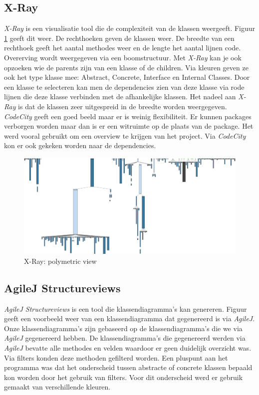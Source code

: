 \documentclass[i1]{oss}
\begin{document}
\subsection{X-Ray} 
\emph{X-Ray} is een visualisatie tool die de complexiteit van de klassen weergeeft. Figuur \ref{fig:X-Ray} geeft dit weer. De rechthoeken geven de klassen weer. De breedte van een rechthoek geeft het aantal methodes weer en de lengte het aantal lijnen code. Overerving wordt weergegeven via een boomstructuur. Met \emph{X-Ray} kan je ook opzoeken wie de parents zijn van een klasse of de children. Via kleuren geven ze ook het type klasse mee: Abstract, Concrete, Interface en Internal Classes. Door een klasse te selecteren kan men de dependencies zien van deze klasse via rode lijnen die deze klasse verbinden met de afhankelijke klassen. Het nadeel aan \emph{X-Ray} is dat de klassen zeer uitgespreid in de breedte worden weergegeven. \\
\emph{CodeCity} geeft een goed beeld maar er is weinig flexibiliteit. Er kunnen packages verborgen worden maar dan is er een witruimte op de plaats van de package. Het werd vooral gebruikt om een overview te krijgen van het project. Via \emph{CodeCity} kon er ook gekeken worden naar de dependencies. 


\begin{figure}[!ht]
	\centering
	\includegraphics[width=\textwidth]{XRayComplexity}
	\caption{X-Ray: polymetric view}
	\label{fig:X-Ray}
\end{figure}

\subsection{AgileJ Structureviews}
\emph{AgileJ Structureviews} is een tool die klassendiagramma's kan genereren. Figuur \label{fig:AgileJklassendia} geeft een voorbeeld weer van een klassendiagramma dat gegenereerd is via \emph{AgileJ}.\\
Onze klassendiagramma's zijn gebaseerd op de klassendiagramma's die we via \emph{AgileJ} gegenereerd hebben. De klassendiagramma's die gegenereerd werden via \emph{AgileJ} bevatte alle methodes en velden waardoor er geen duidelijk overzicht was. Via filters konden deze methoden gefilterd worden. Een pluspunt aan het programma was dat het onderscheid tussen abstracte of concrete klassen bepaald kon worden door het gebruik van filters. Voor dit onderscheid werd er gebruik gemaakt van verschillende kleuren.\\
\end{document}
